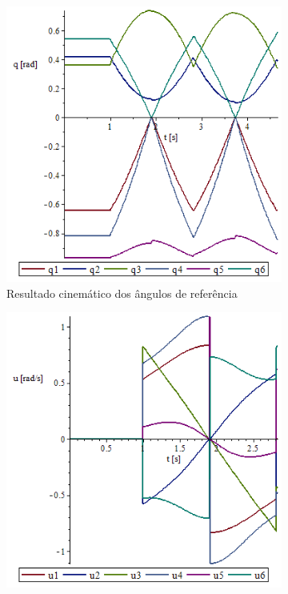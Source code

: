 \begin{figure}[h]
    \centering
    \begin{subfigure}[b]{0.45\textwidth}
        \includegraphics[width=\textwidth]{figs/qxt_exemplo}
        \caption{Resultado cinemático dos ângulos de referência }
        \label{fig::qxt_exemplo}
    \end{subfigure}
    \quad %
    \begin{subfigure}[b]{0.45\textwidth}
        \includegraphics[width=\textwidth]{figs/uxt_exemplo}

\end{subfigure}
\end{figure}
